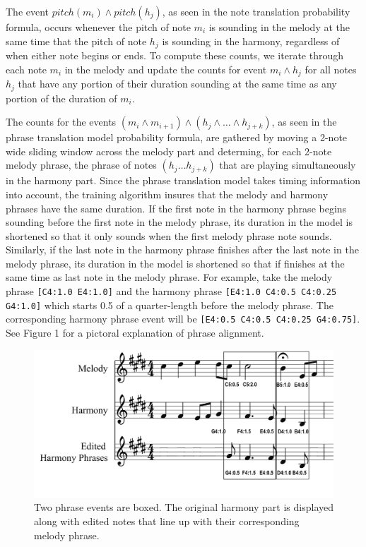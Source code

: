 \documentclass{sig-alternate}
\begin{document}
The event $pitch(m_{i}) \wedge pitch(h_{j})$, as seen in the note translation probability formula, occurs whenever the pitch of note $m_{i}$ is sounding in the melody at the same time that the pitch of note $h_{j}$ is sounding in the harmony, regardless of when either note begins or ends. To compute these counts, we iterate through each note $m_{i}$ in the melody and update the counts for event $m_{i} \wedge h_{j}$ for all notes $h_{j}$ that have any portion of their duration sounding at the same time as any portion of the duration of $m_{i}$.

The counts for the events $(m_{i} \wedge m_{i+1}) \wedge (h_{j} \wedge \ldots \wedge h_{j+k})$, as seen in the phrase translation model probability formula, are gathered by moving a 2-note wide sliding window across the melody part
and determing, for each 2-note melody phrase, the phrase of notes $(h_{j} \ldots h_{j + k})$ that are playing simultaneously in the harmony part. Since the phrase translation model takes timing information into account, the training algorithm insures that the melody and harmony phrases have the same duration. If the first note in the harmony phrase begins sounding before the first note in the melody phrase, its duration in the model is shortened so that it only sounds when the first melody phrase note sounds. Similarly, if the last note in the harmony phrase finishes after the last note in the melody phrase, its duration in the model is shortened so that if finishes at the same time as last note in the melody phrase. For example, take the melody phrase \texttt{[C4:1.0 E4:1.0]} and the harmony phrase \texttt{[E4:1.0 C4:0.5 C4:0.25 G4:1.0]} which starts 0.5 of a quarter-length before the melody phrase. The corresponding harmony phrase event will be \texttt{[E4:0.5 C4:0.5 C4:0.25 G4:0.75]}. See Figure 1 for a pictoral explanation of phrase alignment.

\begin{figure}
	\includegraphics[scale=0.08]{./phrase_examples.png}
	\caption{Two phrase events are boxed. The original harmony part is displayed along with edited notes that line up with their corresponding melody phrase.}
\end{figure} 
\end{document}
